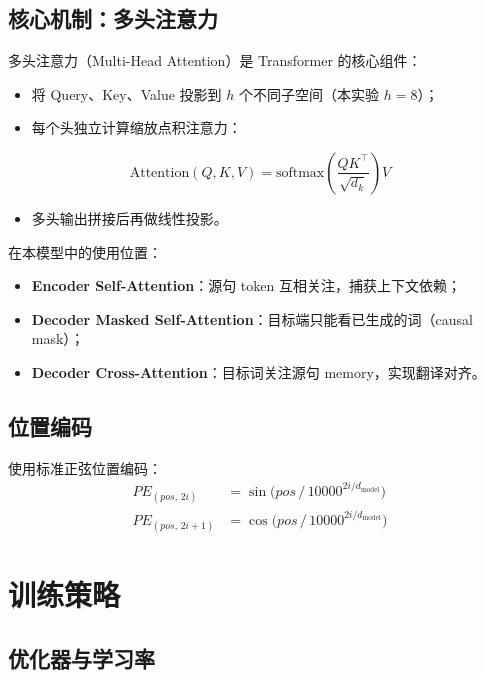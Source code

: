 \documentclass[12pt, a4paper]{ctexart}
\begin{document}
\subsection{核心机制：多头注意力}

多头注意力（Multi-Head Attention）是 Transformer 的核心组件：
\begin{itemize}[nosep]
  \item 将 Query、Key、Value 投影到 $h$ 个不同子空间（本实验 $h=8$）；
  \item 每个头独立计算缩放点积注意力：
\end{itemize}
\begin{equation}
  \text{Attention}(Q, K, V) = \text{softmax}\!\left(\frac{QK^\top}{\sqrt{d_k}}\right) V
\end{equation}
\begin{itemize}[nosep]
  \item 多头输出拼接后再做线性投影。
\end{itemize}

在本模型中的使用位置：
\begin{itemize}[nosep]
  \item \textbf{Encoder Self-Attention}：源句 token 互相关注，捕获上下文依赖；
  \item \textbf{Decoder Masked Self-Attention}：目标端只能看已生成的词（causal mask）；
  \item \textbf{Decoder Cross-Attention}：目标词关注源句 memory，实现翻译对齐。
\end{itemize}

\subsection{位置编码}

使用标准正弦位置编码：
\begin{align}
  PE_{(pos,\,2i)}   &= \sin\!\bigl(pos \,/\, 10000^{2i/d_{\text{model}}}\bigr) \\
  PE_{(pos,\,2i+1)} &= \cos\!\bigl(pos \,/\, 10000^{2i/d_{\text{model}}}\bigr)
\end{align}

\section{训练策略}

\subsection{优化器与学习率}
\end{document}
